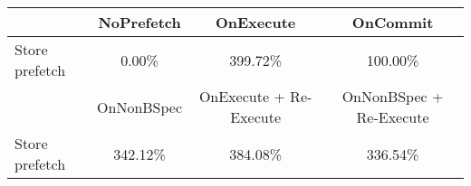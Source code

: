 \begin{tabular}{ l|ccc }
 & NoPrefetch & OnExecute & OnCommit\\ \hline
Store prefetch & 0.00\% & 399.72\% & 100.00\%\\ \hline
\hline
 & OnNonBSpec & OnExecute + Re-Execute & OnNonBSpec + Re-Execute\\ \hline
Store prefetch & 342.12\% & 384.08\% & 336.54\%\\ \hline
\end{tabular}

